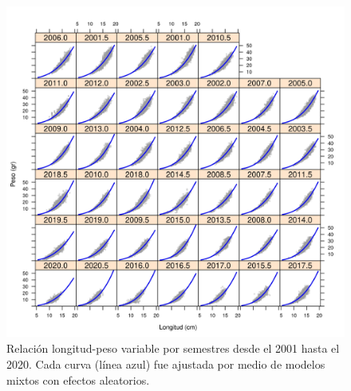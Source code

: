 \documentclass[letter,11pt]{article}
\begin{document}
\vspace{0.5cm}
\begin{figure}[htb!]
 \centering
 \includegraphics[width=13cm,height=11cm]{Figuras/figura15.pdf}
 \caption{Relaci\'on longitud-peso variable por semestres desde el 2001 hasta el 2020. Cada curva (l\'inea azul) fue ajustada por medio de modelos mixtos con efectos aleatorios.}
 \label{Fig15}
\end{figure}

\newpage
\end{document}
